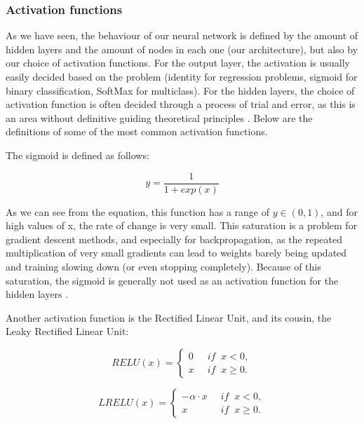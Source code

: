 \documentclass[onecolumn,10pt,cleanfoot]{asme2ej}
\begin{document}
\subsubsection{Activation functions}

As we have seen, the behaviour of our neural network is defined by the amount of hidden layers and the amount of nodes in each one (our architecture), but also by our choice of activation functions. For the output layer, the activation is usually easily decided based on the problem (identity for regression problems, sigmoid for binary classification, SoftMax for multiclass). For the hidden layers, the choice of activation function is often decided through a process of trial and error, as this is an area without definitive guiding theoretical principles \cite[188]{gbc}. Below are the definitions of some of the most common activation functions.

The sigmoid is defined as follows:

\begin{equation}
y = \frac{1}{1 + exp(x)}
\end{equation}

As we can see from the equation, this function has a range of $y \in (0,1)$, and for high values of x, the rate of change is very small. This saturation is a problem for gradient descent methods, and especially for backpropagation, as the repeated multiplication of very small gradients can lead to weights barely being updated and training slowing down (or even stopping completely). Because of this saturation, the sigmoid is generally not used as an activation function for the hidden layers \cite[191]{gbc}.

Another activation function is the Rectified Linear Unit, and its cousin, the Leaky Rectified Linear Unit:

\begin{equation}
RELU(x) = \left\{\begin{array}{cc} 0 & \; \; if \; \; x < 0, \\  x & \; \; if \; \; x \ge 0.\end{array}\right.
\end{equation}

\begin{equation}
LRELU(x) = \left\{\begin{array}{cc} -\alpha \cdot x & \; \; if \; \; x < 0, \\  x & \; \; if \; \; x \ge 0.\end{array}\right.
\end{equation}
\end{document}
